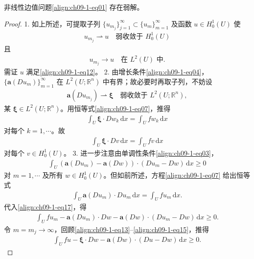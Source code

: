 \documentclass[../../main.tex]{subfiles}
\begin{document}
\begin{theorem}[弱解的存在性]\label{theorem:ch09-1-3-弱解存在}
非线性边值问题\eqref{align:ch09-1-eq01} 存在弱解。
\begin{proof}
1. 如上所述，可提取子列 $\{u_{m_j}\}_{j=1}^\infty\subset\{u_m\}_{m=1}^\infty$ 及函数 $u\in H_0^1(U)$ 使
\begin{align}
u_{m_j}\rightharpoonup u\quad\text{弱收敛于 }H_0^1(U)\label{align:ch09-1-eq13}
\end{align}
且
\begin{align}
u_{m_j}\to u\quad\text{在 }L^2(U)\text{ 中}.\label{align:ch09-1-eq14}
\end{align}
需证 $u$ 满足\eqref{align:ch09-1-eq12}。
2. 由增长条件\eqref{align:ch09-1-eq04}，$\{\mathbf{a}(Du_m)\}_{m=1}^\infty$ 在 $L^2(U;\mathbb{R}^n)$ 中有界；故必要时再取子列，不妨设
\begin{align}
\mathbf{a}(Du_{m_j})\rightharpoonup\boldsymbol{\xi}\quad\text{弱收敛于 }L^2(U;\mathbb{R}^n),\label{align:ch09-1-eq15}
\end{align}
某 $\boldsymbol{\xi}\in L^2(U;\mathbb{R}^n)$。用恒等式\eqref{align:ch09-1-eq07}，推得
\begin{align*}
\int_U\boldsymbol{\xi}\cdot Dw_k\,\mathrm{d}x=\int_U fw_k\,\mathrm{d}x
\end{align*}
对每个 $k=1,\cdots$。故
\begin{align}
\int_U\boldsymbol{\xi}\cdot Dv\,\mathrm{d}x=\int_U fv\,\mathrm{d}x\label{align:ch09-1-eq16}
\end{align}
对每个 $v\in H_0^1(U)$。
3. 进一步注意由单调性条件\eqref{align:ch09-1-eq03}，
\begin{align}
\int_U(\mathbf{a}(Du_m)-\mathbf{a}(Dw))\cdot(Du_m-Dw)\,\mathrm{d}x\geqslant 0\label{align:ch09-1-eq17}
\end{align}
对 $m=1,\cdots$ 及所有 $w\in H_0^1(U)$。但如前所述，方程\eqref{align:ch09-1-eq07} 给出恒等式
\begin{align*}
\int_U\mathbf{a}(Du_m)\cdot Du_m\,\mathrm{d}x=\int_U fu_m\,\mathrm{d}x.
\end{align*}
代入\eqref{align:ch09-1-eq17}，得
\begin{align*}
\int_U fu_m-\mathbf{a}(Du_m)\cdot Dw-\mathbf{a}(Dw)\cdot(Du_m-Dw)\,\mathrm{d}x\geqslant 0.
\end{align*}
令 $m=m_j\to\infty$，回顾\eqref{align:ch09-1-eq13}--\eqref{align:ch09-1-eq15}，推得
\begin{align*}
\int_U fu-\boldsymbol{\xi}\cdot Dw-\mathbf{a}(Dw)\cdot(Du-Dw)\,\mathrm{d}x\geqslant 0.
\end{align*}

\end{proof}
\end{theorem}
\end{document}
